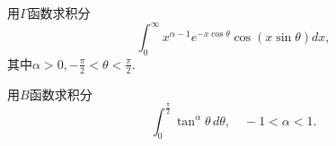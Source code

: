 \documentclass[11pt]{article}
\begin{document}
\vspace{0.5cm}

\begin{hwproblem}{}
    用$\Gamma$函数求积分
    $$
    \int_0^\infty x^{\alpha -1 } e^{-x \cos{\theta}} \cos\left( x \sin{\theta} \right) dx,
    $$
    其中$\alpha > 0, -\frac{\pi}{2} < \theta < \frac{\pi}{2}$.  
\end{hwproblem}

\vspace{0.5cm}

  
  
\begin{hwproblem}{}
用$B$函数求积分
$$
\int_0^{\frac{\pi}{2}} \tan^\alpha{\theta} \,  d\theta, \quad  -1 < \alpha < 1.
$$
\end{hwproblem}

\vspace{0.5cm}
    


\vspace{0.5cm}


\vspace{0.5cm}


\vspace{0.5cm}

\hwrequirements
\end{document}
